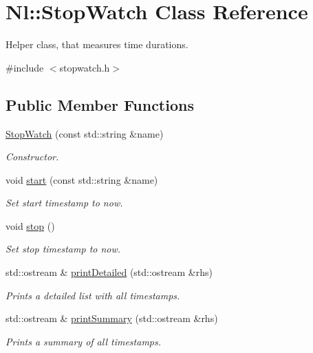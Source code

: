 \hypertarget{classNl_1_1StopWatch}{\section{Nl\-:\-:Stop\-Watch Class Reference}
\label{classNl_1_1StopWatch}
}


Helper class, that measures time durations.  




{\ttfamily \#include $<$stopwatch.\-h$>$}

\subsection*{Public Member Functions}
\begin{DoxyCompactItemize}
\item 
\hyperlink{group__Tools_ga086b4f40c93978f661d5154f31081677}{Stop\-Watch} (const std\-::string \&name)
\begin{DoxyCompactList}\small\item\em Constructor. \end{DoxyCompactList}\item 
void \hyperlink{group__Tools_ga0171f821750460729b49db731d20e214}{start} (const std\-::string \&name)
\begin{DoxyCompactList}\small\item\em Set start timestamp to now. \end{DoxyCompactList}\item 
void \hyperlink{group__Tools_ga2b770511bceacff939c8bbf69e25445f}{stop} ()
\begin{DoxyCompactList}\small\item\em Set stop timestamp to now. \end{DoxyCompactList}\item 
std\-::ostream \& \hyperlink{group__Tools_gacd1b3793ab5f126af64122dcfabf1020}{print\-Detailed} (std\-::ostream \&rhs)
\begin{DoxyCompactList}\small\item\em Prints a detailed list with all timestamps. \end{DoxyCompactList}\item 
std\-::ostream \& \hyperlink{group__Tools_ga8d07863904ca88de29fe3906ee1ae0a6}{print\-Summary} (std\-::ostream \&rhs)
\begin{DoxyCompactList}\small\item\em Prints a summary of all timestamps. \end{DoxyCompactList}\end{DoxyCompactItemize}


